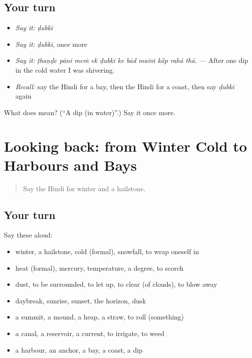\subsection*{Your turn}
\begin{itemize}
\raggedright
  \item \emph{Say it:} \emph{ḍubkī}
  \item \emph{Say it:} \emph{ḍubkī}, once more
  \item \emph{Say it:} \emph{ṭhaṇḍe pānī meṁ ek ḍubkī ke bād maiṁ kā̃p rahā thā.} — After one dip in the cold water I was shivering.
  \item \emph{Recall:} say the Hindi for a bay, then the Hindi for a coast, then say \emph{ḍubkī} again
\end{itemize}

\begin{tcolorbox}[breakable,colback=teal!4,colframe=teal!35!black,title={Before you move on}]
What does  mean? (\textquotedblleft{}A dip (in water)\textquotedblright{}.) Say it once more.
\end{tcolorbox}
\section[(dialogue)]{Looking back: from Winter Cold to Harbours and Bays}

\label{lesson:HI-R444-review-438-444}



\begin{quote}
Say the Hindi for winter and a hailstone.
\end{quote}

\subsection*{Your turn}
Say these aloud:

\begin{itemize}
\raggedright
  \item winter, a hailstone, cold (formal), snowfall, to wrap oneself in
  \item heat (formal), mercury, temperature, a degree, to scorch
  \item dust, to be surrounded, to let up, to clear (of clouds), to blow away
  \item daybreak, sunrise, sunset, the horizon, dusk
  \item a summit, a mound, a heap, a straw, to roll (something)
  \item a canal, a reservoir, a current, to irrigate, to weed
  \item a harbour, an anchor, a bay, a coast, a dip
\end{itemize}

